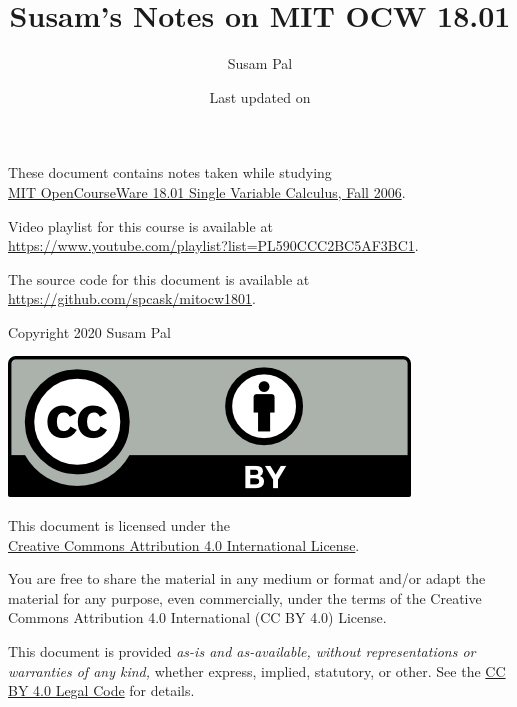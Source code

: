 \documentclass{article}
\author{Susam Pal}
\title{Susam's Notes on MIT OCW 18.01}
\date{
    \small Last updated on \updatedate
}
\theoremstyle{definition}
\begin{document}
\maketitle
\pagebreak

\newcommand{\texurl}{https://github.com/spcask/mitocw1801}
\newcommand{\ocwurl}{https://ocw.mit.edu/courses/mathematics/18-01-single-variable-calculus-fall-2006/}
\newcommand{\vidurl}{https://www.youtube.com/playlist?list=PL590CCC2BC5AF3BC1}
\newcommand{\ccbyurl}{http://creativecommons.org/licenses/by/4.0/}
\newcommand{\ccbylcurl}{https://creativecommons.org/licenses/by/4.0/legalcode}
\newcommand{\mitlurl}{https://opensource.org/licenses/MIT}
These document contains notes taken while studying \\
\href{\ocwurl}{MIT OpenCourseWare 18.01 Single Variable Calculus, Fall
2006}.

Video playlist for this course is available at \\
\url{\vidurl}.

The source code for this document is available at \\
\url{\texurl}.

\vspace{20mm}
Copyright \textcopyright{} 2020 Susam Pal

\href{\ccbyurl}{\includegraphics{ccby}}

This document is licensed under the\\
\href{\ccbyurl}{Creative Commons Attribution 4.0 International License}.

You are free to share the material in any medium or format and/or adapt
the material for any purpose, even commercially, under the terms of the
Creative Commons Attribution 4.0 International (CC BY 4.0) License.

This document is provided \emph{as-is and as-available, without
representations or warranties of any kind,} whether express, implied,
statutory, or other. See the
\href{\ccbylcurl}{CC BY 4.0 Legal Code} for details.
\pagebreak

\tableofcontents
\pagebreak


\end{document}
